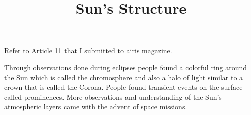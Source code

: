 \documentclass{../template/texnote}
\title{Sun's Structure}
\begin{document}
    \maketitle {}
Refer to Article 11 that I submitted to airis magazine.

Through observations done during eclipses people found a colorful ring around the Sun which is called the chromosphere and also a halo of light similar to a crown that is called the Corona.
People found transient events on the surface called prominences.
More observations and understanding of the Sun's atmospheric  layers came with the advent of space missions.

    \printbibliography
\end{document}

